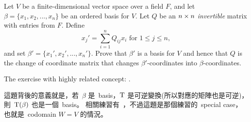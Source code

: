 \begin{exercise} \label{exercise 2.5.13}
\sloppy Let \(V\) be a finite-dimensional vector space over a field \(F\), and let \(\beta = \{ x_1, x_2, ..., x_n \}\) be an ordered basis for \(V\).
Let \(Q\) be an \(n \times n\) \emph{invertible} matrix with entries from \(F\).
Define
\[
    x_j' = \sum_{i = 1}^n Q_{ij} x_i \text{ for } 1 \le j \le n,
\]
and set \(\beta' = \{ x_1', x_2', ..., x_n' \}\).
Prove that \(\beta'\) is a basis for \(V\) and hence that \(Q\) is the change of coordinate matrix that changes \(\beta'\)-coordinates into \(\beta\)-coordinates.
\end{exercise}

\begin{note}
The exercise with highly related concept: .
\end{note}

\begin{note}
這題背後的意義就是，若\ \(\beta\) 是\ basis，\(\mathrm{T}\) 是可逆變換(所以對應的矩陣也是可逆)，則\ \(\mathrm{T}(\beta)\) 也是一個\ basis。
相關練習有\ ，不過這題是那個練習的\ special case，也就是\ codomain \(W = V\) 的情況。
\end{note}

